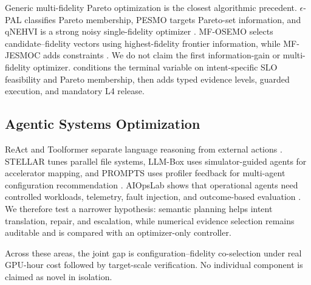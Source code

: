 Generic multi-fidelity Pareto optimization is the closest algorithmic
precedent.  $\epsilon$-PAL classifies Pareto membership, PESMO targets Pareto-set
information, and qNEHVI is a strong noisy single-fidelity optimizer
\cite{zuluaga2016epal,hernandezlobato2016pesmo,daulton2021qnehvi}.  MF-OSEMO
selects candidate--fidelity vectors using highest-fidelity frontier information,
while MF-JESMOC adds constraints
\cite{belakaria2020mfosemo,fernandezsanchez2025mfjesmoc}.  We do not claim the
first information-gain or multi-fidelity optimizer.  \ipig{} conditions the
terminal variable on intent-specific SLO feasibility and Pareto membership,
then adds typed evidence levels, guarded execution, and mandatory L4 release.

\subsection{Agentic Systems Optimization}

ReAct and Toolformer separate language reasoning from external actions
\cite{yao2023react,schick2023toolformer}.  STELLAR tunes parallel file systems,
LLM-Box uses simulator-guided agents for accelerator mapping, and PROMPTS uses
profiler feedback for multi-agent configuration recommendation
\cite{egersdoerfer2025stellar,pandit2025llmbox,ding2026prompts}.  AIOpsLab shows
that operational agents need controlled workloads, telemetry, fault injection,
and outcome-based evaluation \cite{chen2025aiopslab}.  We therefore test a
narrower hypothesis: semantic planning helps intent translation, repair, and
escalation, while numerical evidence selection remains auditable and is
compared with an optimizer-only controller.

Across these areas, the joint gap is configuration--fidelity co-selection under
real GPU-hour cost followed by target-scale verification.  No individual
component is claimed as novel in isolation.
